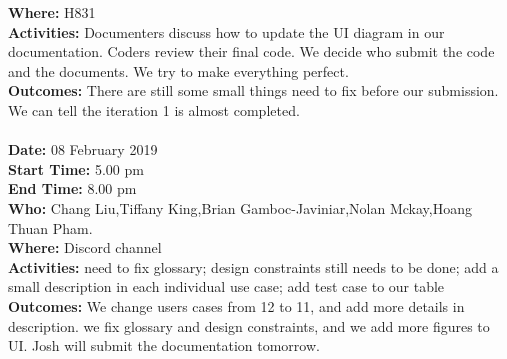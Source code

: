 \documentclass[12pt]{article}
\begin{document}
{\bf Where:} H831 \\
{\bf Activities:}  Documenters discuss how to update the UI diagram in our documentation. Coders review their final code. We decide who submit the code and the documents. We try to make everything perfect.\\
{\bf Outcomes:} There are still some small things need to fix before our submission. We can tell the iteration 1 is almost completed. \\\\
{\bf Date:} 08 February 2019\\
{\bf Start Time:} 5.00 pm\\
{\bf End Time:} 8.00 pm \\
{\bf Who:} Chang Liu,Tiffany King,Brian Gamboc-Javiniar,Nolan Mckay,Hoang Thuan Pham.\\
{\bf Where:} Discord channel \\
{\bf Activities:} need to fix glossary;  design constraints still needs to be done; add a small description in each individual use case; add test case to our table\\
{\bf Outcomes:} We change users cases from 12 to 11, and add more details in description. we fix glossary and design constraints, and we add more figures to UI. Josh will submit the documentation tomorrow. \\\\\\
\end{document}
